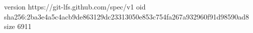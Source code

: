 version https://git-lfs.github.com/spec/v1
oid sha256:2ba3e4a5c4acb9de863129dc23313050e853c754fa267a932960f91d98590ad8
size 6911
